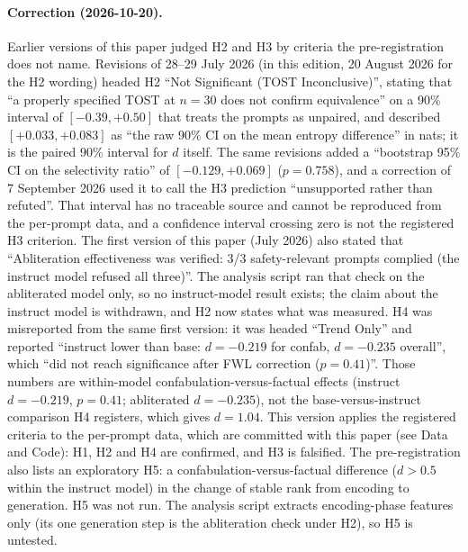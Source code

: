\documentclass[11pt,a4paper]{article}
\begin{document}
\paragraph{Correction (2026-10-20).}
Earlier versions of this paper judged H2 and H3 by criteria the
pre-registration does not name. Revisions of 28--29 July 2026 (in this
edition, 20 August 2026 for the H2 wording) headed H2
``Not Significant (TOST Inconclusive)'', stating that ``a properly
specified TOST at $n{=}30$ does not confirm equivalence'' on a 90\%
interval of $[-0.39, +0.50]$ that treats the prompts as unpaired, and
described $[+0.033, +0.083]$ as ``the raw 90\% CI on the mean entropy
difference'' in nats; it is the paired 90\% interval for $d$ itself.
The same revisions added a ``bootstrap 95\% CI on the selectivity
ratio'' of $[-0.129, +0.069]$ ($p{=}0.758$), and a correction of 7
September 2026 used it to call the H3 prediction ``unsupported rather
than refuted''. That interval has no traceable source and cannot be
reproduced from the per-prompt data, and a confidence interval crossing
zero is not the registered H3 criterion. The first version of this paper
(July 2026) also stated that ``Abliteration effectiveness was verified:
3/3 safety-relevant prompts complied (the instruct model refused all
three)''. The analysis script ran that check on the abliterated model
only, so no instruct-model result exists; the claim about the instruct
model is withdrawn, and H2 now states what was measured. H4 was
misreported from the same first version: it was headed ``Trend Only''
and reported ``instruct lower than base: $d{=}-0.219$ for confab,
$d{=}-0.235$ overall'', which ``did not reach significance after FWL
correction ($p{=}0.41$)''. Those numbers are within-model
confabulation-versus-factual effects (instruct $d = -0.219$,
$p = 0.41$; abliterated $d = -0.235$), not the base-versus-instruct
comparison H4 registers, which gives $d = 1.04$. This version applies
the registered criteria to the per-prompt data, which are committed
with this paper (see Data and Code): H1, H2 and H4 are confirmed, and
H3 is falsified. The pre-registration also lists an exploratory H5:
a confabulation-versus-factual difference ($d > 0.5$ within the
instruct model) in the change of stable rank from encoding to
generation. H5 was not run. The analysis script extracts
encoding-phase features only (its one generation step is the
abliteration check under H2), so H5 is untested.
\end{document}

